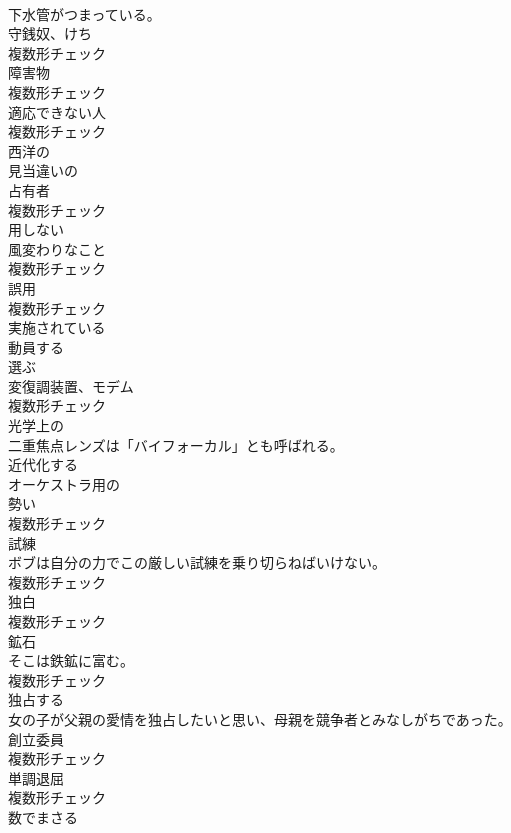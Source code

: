 \documentclass[8pt]{extreport}
\begin{document}
\begin{CJK}{UTF8}{min}
\\	下水管がつまっている。	
\\	[名詞]	守銭奴、けち	
\\	複数形チェック
\\	[名詞]	障害物	
\\	複数形チェック
\\	[名詞]	適応できない人	
\\	複数形チェック
\\	[形容詞]	⻄洋の	
\\	[形容詞]	見当違いの	
\\	[名詞]	占有者	
\\	複数形チェック
\\	[動詞]	用しない	
\\	[名詞]	風変わりなこと	
\\	複数形チェック
\\	[名詞]	誤用	
\\	複数形チェック
\\	[形容詞]	実施されている	
\\	[動詞]	動員する	
\\	[動詞]	選ぶ	
\\	[名詞]	変復調装置、モデム	
\\	複数形チェック
\\	[形容詞]	光学上の	
\\	二重焦点レンズは「バイフォーカル」とも呼ばれる。	
\\	[動詞]	近代化する	
\\	[形容詞]	オーケストラ用の	
\\	[名詞]	勢い	
\\	複数形チェック
\\	[名詞]	試練	
\\	ボブは自分の力でこの厳しい試練を乗り切らねばいけない。	
\\	複数形チェック
\\	[名詞]	独白	
\\	複数形チェック
\\	[名詞]	鉱石	
\\	そこは鉄鉱に富む。	
\\	複数形チェック
\\	[動詞]	独占する	
\\	女の子が父親の愛情を独占したいと思い、母親を競争者とみなしがちであった。	
\\	[名詞]	創立委員	
\\	複数形チェック
\\	[名詞]	単調退屈	
\\	複数形チェック
\\	[動詞]	数でまさる	

\end{CJK}
\end{document}
